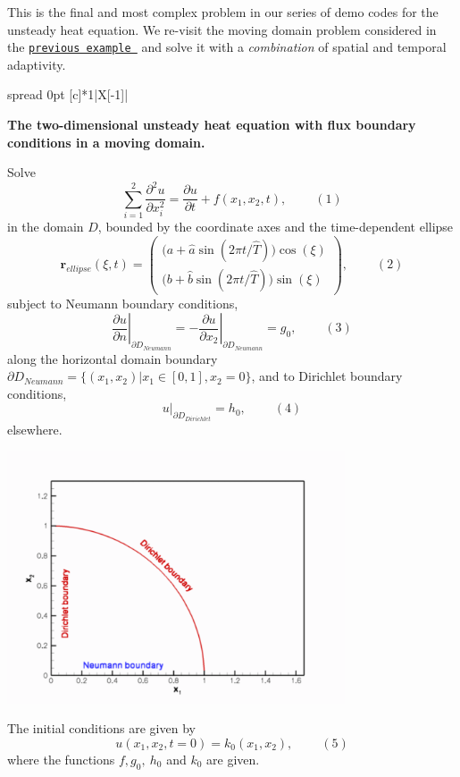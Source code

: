 This is the final and most complex problem in our series of demo codes for the unsteady heat equation. We re-\/visit the moving domain problem considered in the \href{../../two_d_unsteady_heat_ALE/html/index.html}{\tt previous example } and solve it with a {\itshape combination} of spatial and temporal adaptivity.

\begin{center} \tabulinesep=1mm
\begin{longtabu} spread 0pt [c]{*{1}{|X[-1]}|}
\hline
\begin{center} {\bfseries The two-\/dimensional unsteady heat equation with flux boundary conditions in a moving domain.} \end{center}  Solve \[ \sum_{i=1}^2\frac{\partial^2 u}{\partial x_i^2} = \frac{\partial u}{\partial t} + f\left(x_1,x_2,t\right), \ \ \ \ \ \ \ \ \ \ (1) \] in the domain $ D $, bounded by the coordinate axes and the time-\/dependent ellipse \[ \mathbf{r}_{ellipse}(\xi,t) = \left( \begin{array}{c} \big(a+\hat{a}\sin(2\pi t/\hat{T})\big) \cos(\xi) \\ \big(b+\hat{b}\sin(2\pi t/\hat{T})\big) \sin(\xi) \end{array} \right), \ \ \ \ \ \ \ \ \ \ (2) \] subject to Neumann boundary conditions, \[ \left. \frac{\partial u}{\partial n}\right|_{\partial D_{Neumann}}= - \left. \frac{\partial u}{\partial x_2}\right|_{\partial D_{Neumann}}= g_0, \ \ \ \ \ \ \ \ \ \ (3) \] along the horizontal domain boundary $ \partial D_{Neumann} = \{ (x_1,x_2) | x_1 \in [0,1], x_2=0 \} $, and to Dirichlet boundary conditions, \[ \left. u\right|_{\partial D_{Dirichlet}}=h_0, \ \ \ \ \ \ \ \ \ \ (4) \] elsewhere.  
\begin{DoxyImage}
\includegraphics[width=0.75\textwidth]{domain}
\end{DoxyImage}
 The initial conditions are given by \[ u(x_1,x_2,t=0)=k_0(x_1,x_2), \ \ \ \ \ \ \ \ \ \ (5) \] where the functions $ f, g_0, \ h_0$ and $ k_0$ are given.   \\
\end{longtabu}
\end{center} 


